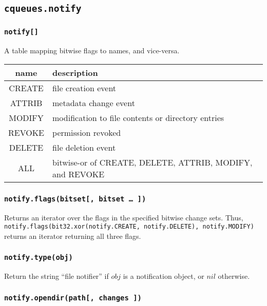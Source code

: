 \documentclass[11pt, oneside]{memoir}
\newcommand{\routine}[1]{\texttt{#1} }
\newcommand{\fn}[1]{\texttt{#1} }
\newcounter{toccols}
\newenvironment{Module}[1]{
	\subsection{\texttt{#1}}
	\addtocontents{toc}{
		\protect\begin{multicols}{\value{toccols}}
	}
}{
	\addtocontents{toc}{\protect\end{multicols}}
}
\begin{document}
\begin{Module}{cqueues.notify}

\subsubsection[\fn{notify[]}]{\fn{notify[]}}
A table mapping bitwise flags to names, and vice-versa.

\begin{tabular}{c | l}

name & description \\\hline
CREATE & file creation event \\
ATTRIB & metadata change event \\
MODIFY & modification to file contents or directory entries \\
REVOKE & permission revoked \\
DELETE & file deletion event \\
ALL    & bitwise-or of CREATE, DELETE, ATTRIB, MODIFY, and REVOKE
\end{tabular}

\subsubsection[\fn{notify.flags}]{\fn{notify.flags(bitset[, bitset … ])}}

Returns an iterator over the flags in the specified bitwise change sets. Thus, \texttt{notify.flags(bit32.xor(notify.CREATE, notify.DELETE), notify.MODIFY)} returns an iterator returning all three flags.

\subsubsection[\routine{notify.type}]{\routine{notify.type(obj)}}
Return the string ``file notifier'' if $obj$ is a notification object, or $nil$ otherwise.

\subsubsection[\fn{notify.opendir}]{\fn{notify.opendir(path[, changes ])}}


\end{Module}
\end{document}

